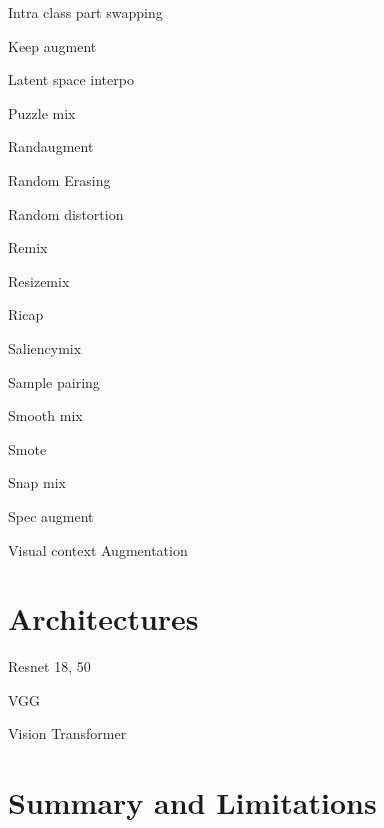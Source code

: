 Intra class part swapping

Keep augment

Latent space interpo

Puzzle mix

Randaugment

Random Erasing

Random distortion

Remix

Resizemix

Ricap

Saliencymix

Sample pairing

Smooth mix

Smote

Snap mix

Spec augment

Visual context Augmentation

\section{Architectures}
Resnet 18, 50

VGG

Vision Transformer

\section{Summary and Limitations}